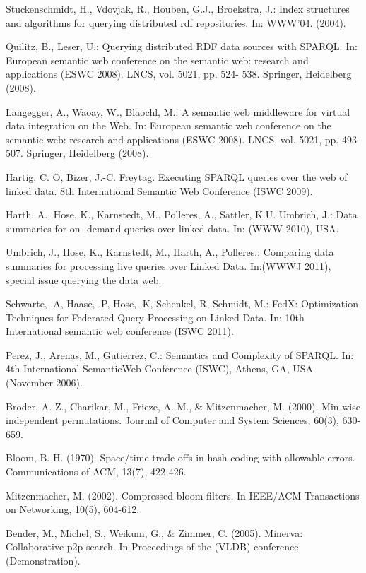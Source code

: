 \documentclass{sig-alternate}  %
\begin{document}
\begin{thebibliography}{10}
Stuckenschmidt, H., Vdovjak, R., Houben, G.J., Broekstra,
J.: Index structures and algorithms for querying distributed rdf repositories.
In: WWW'04. (2004).

Quilitz, B., Leser, U.: Querying distributed RDF data
sources with SPARQL. In: European semantic web conference on the semantic
web: research and applications (ESWC 2008). LNCS, vol. 5021, pp. 524-
538. Springer, Heidelberg (2008).

Langegger, A., Waoay, W., Blaochl, M.: A semantic web
middleware for virtual data integration on the Web. In: European semantic
web conference on the semantic web: research and applications (ESWC
2008). LNCS, vol. 5021, pp. 493-507. Springer, Heidelberg (2008).

Hartig, C. O, Bizer, J.-C. Freytag. Executing SPARQL
queries over the web of linked data. 8th International Semantic Web
Conference (ISWC 2009).

Harth, A., Hose, K., Karnstedt, M., Polleres, A.,
Sattler, K.U. Umbrich, J.: Data summaries for on- demand queries over
linked data. In: (WWW 2010), USA.

Umbrich, J., Hose, K., Karnstedt, M., Harth, A., Polleres.:
Comparing data summaries for processing live queries over Linked Data.
In:(WWWJ 2011), special issue querying the data web. 

Schwarte, .A, Haase, .P, Hose, .K, Schenkel, R, Schmidt,
M.: FedX: Optimization Techniques for Federated Query Processing on
Linked Data. In: 10th International semantic web conference (ISWC
2011).

Perez, J., Arenas, M., Gutierrez, C.: Semantics and
Complexity of SPARQL. In: 4th International SemanticWeb Conference
(ISWC), Athens, GA, USA (November 2006).

Broder, A. Z., Charikar, M., Frieze, A. M., \& Mitzenmacher,
M. (2000). Min-wise independent permutations. Journal of Computer
and System Sciences, 60(3), 630-659.

Bloom, B. H. (1970). Space/time trade-offs in hash
coding with allowable errors. Communications of ACM, 13(7), 422-426.

Mitzenmacher, M. (2002). Compressed bloom filters.
In IEEE/ACM Transactions on Networking, 10(5), 604-612.

Bender, M., Michel, S., Weikum, G., \& Zimmer, C.
(2005). Minerva: Collaborative p2p search. In Proceedings of the (VLDB)
conference (Demonstration).


\end{thebibliography}
\end{document}

